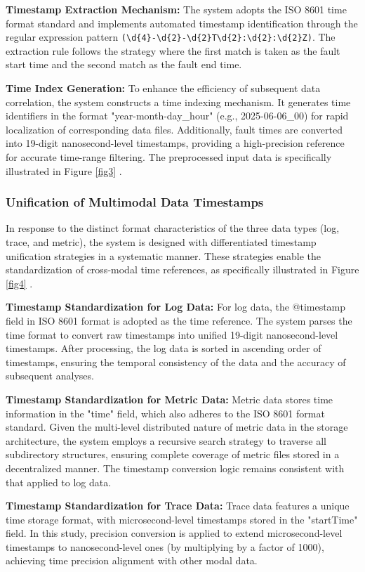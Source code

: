 \documentclass[10pt]{article}
\let\oldref\ref
\renewcommand{\ref}[1]{%
    \textcolor{blue}{\oldref{#1}}%
}
\begin{document}
\textbf{Timestamp Extraction Mechanism:} The system adopts the ISO 8601 time format standard and implements automated timestamp identification through the regular expression pattern \verb!(\d{4}-\d{2}-\d{2}T\d{2}:\d{2}:\d{2}Z)!. The extraction rule follows the strategy where the first match is taken as the fault start time and the second match as the fault end time.

\textbf{Time Index Generation:} To enhance the efficiency of subsequent data correlation, the system constructs a time indexing mechanism. It generates time identifiers in the format "year-month-day\_hour" (e.g., 2025-06-06\_00) for rapid localization of corresponding data files. Additionally, fault times are converted into 19-digit nanosecond-level timestamps, providing a high-precision reference for accurate time-range filtering. The preprocessed input data is specifically illustrated in Figure \ref{fig3}.

\subsubsection{Unification of Multimodal Data Timestamps}

In response to the distinct format characteristics of the three data types (log, trace, and metric), the system is designed with differentiated timestamp unification strategies in a systematic manner. These strategies enable the standardization of cross-modal time references, as specifically illustrated in Figure \ref{fig4}.

\textbf{Timestamp Standardization for Log Data:} For log data, the @timestamp field in ISO 8601 format is adopted as the time reference. The system parses the time format to convert raw timestamps into unified 19-digit nanosecond-level timestamps. After processing, the log data is sorted in ascending order of timestamps, ensuring the temporal consistency of the data and the accuracy of subsequent analyses.

\textbf{Timestamp Standardization for Metric Data:} Metric data stores time information in the "time" field, which also adheres to the ISO 8601 format standard. Given the multi-level distributed nature of metric data in the storage architecture, the system employs a recursive search strategy to traverse all subdirectory structures, ensuring complete coverage of metric files stored in a decentralized manner. The timestamp conversion logic remains consistent with that applied to log data.


\textbf{Timestamp Standardization for Trace Data:} Trace data features a unique time storage format, with microsecond-level timestamps stored in the "startTime" field. In this study, precision conversion is applied to extend microsecond-level timestamps to nanosecond-level ones (by multiplying by a factor of 1000), achieving time precision alignment with other modal data.
\end{document}
